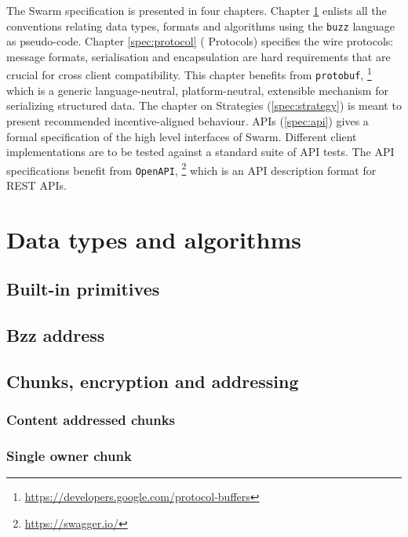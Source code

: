 
The Swarm specification is presented in four chapters. Chapter \ref{spec:convention} enlists all the conventions relating data types, formats and algorithms using the \lstinline{buzz} language as pseudo-code.
Chapter \ref{spec:protocol} ( Protocols) specifies the wire protocols: message formats, serialisation and encapsulation are hard requirements that are crucial for  cross client compatibility. This chapter benefits from \lstinline{protobuf},%
%
\footnote{\url{https://developers.google.com/protocol-buffers}}
%
which is a generic language-neutral, platform-neutral, extensible mechanism for serializing structured data.
The chapter on Strategies (\ref{spec:strategy}) is meant to present recommended incentive-aligned behaviour.
APIs (\ref{spec:api}) gives a formal specification of the high level interfaces of Swarm. Different client implementations are  to be tested against a standard suite of API tests. The API specifications benefit from \lstinline{OpenAPI},%
%
\footnote{\url{https://swagger.io/}}
%
which is an API description format for REST APIs.


\listoftheorems[ignoreall,show={definition}]

\chapter{Data types and algorithms}\label{spec:convention}

\orange{}

\section{Built-in primitives \statusyellow}\label{spec:format:builtin}


\section{Bzz address\statusgreen}\label{spec:format:bzzaddress}


\section{Chunks, encryption and addressing\statusyellow}
\subsection{Content addressed chunks \statusgreen}\label{spec:format:chunks}

\subsection{Single owner chunk \statusgreen}\label{spec:format:soc}

